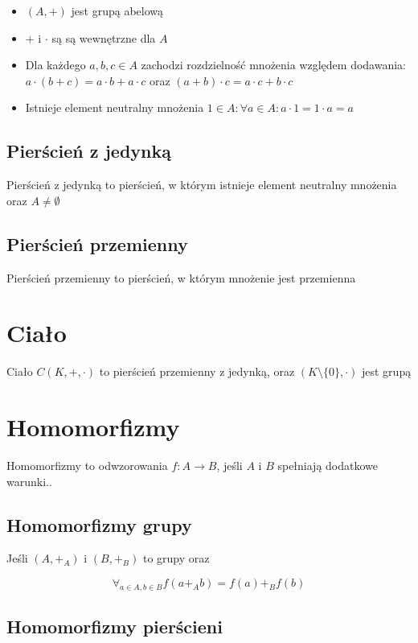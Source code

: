 \documentclass{../notatki}
\begin{document}
\begin{itemize}
  \item $(A, +)$ jest grupą abelową
  \item $+$ i $\cdot$ są są wewnętrzne dla $A$
  \item Dla każdego $a, b, c \in A$ zachodzi rozdzielność mnożenia
    względem dodawania: $a \cdot (b + c) = a \cdot b + a \cdot c$
    oraz $(a + b) \cdot c = a \cdot c + b \cdot c$
  \item Istnieje element neutralny mnożenia $1 \in A: \forall a \in
    A: a \cdot 1 = 1 \cdot a = a$
\end{itemize}

\subsection{Pierścień z jedynką}

Pierścień z jedynką to pierścień, w którym istnieje element neutralny
mnożenia oraz $A \ne \emptyset$

\subsection{Pierścień przemienny}

Pierścień przemienny to pierścień, w którym mnożenie jest przemienna

\section{Ciało}

Ciało $C(K, +, \cdot)$ to pierścień przemienny z jedynką, oraz $(K
\setminus \{0\}, \cdot)$ jest grupą

\section{Homomorfizmy}

Homomorfizmy to odwzorowania $f: A \rightarrow B$, jeśli $A$ i $B$
spełniają dodatkowe warunki..

\subsection{Homomorfizmy grupy}

Jeśli $(A, +_A)$ i $(B, +_B)$ to grupy oraz

$$
\forall_{a \in A, b \in B} f(a +_A b) = f(a) +_B f(b)
$$

\subsection{Homomorfizmy pierścieni}
\end{document}
